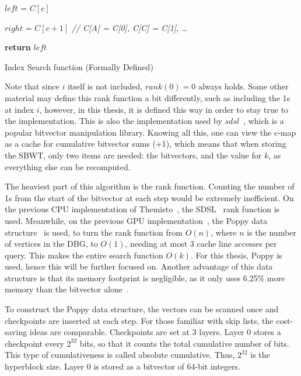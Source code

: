 \begin{algorithm}
  $\mathit{left}$ = $C[c]$

  $right$ = $C[c+1]$  \textit{// C[A] = C[0], C[C] = C[1], \ldots}

  \textbf{return} $\mathit{left}$
  \caption{Index Search function (Formally Defined)}\label{alg:IndexSearchFormalPseudoCode}
\end{algorithm}

Note that since $i$ itself is not included, $\mathit{rank}(0) = 0$ always holds.
Some other material may define this rank function a bit differently, such as including the 1s at index $i$, however, in this thesis, it is defined this way in order to stay true to the implementation.
This is also the implementation used by $sdsl$~\cite{SDSL}, which is a popular bitvector manipulation library.
Knowing all this, one can view the c-map as a cache for cumulative bitvector sums (+1), which means that when storing the SBWT, only two items are needed: the bitvectors, and the value for $k$, as everything else can be recomputed.

The heaviest part of this algorithm is the rank function.
Counting the number of 1s from the start of the bitvector at each step would be extremely inefficient.
On the previous CPU implementation of Themisto~\cite{Themisto}, the SDSL~\cite{SDSL} rank function is used.
Meanwhile, on the previous GPU implementation~\cite{Harri}, the Poppy data structure~\cite{Poppy} is used, to turn the rank function from $O(n)$, where $n$ is the number of vertices in the DBG, to $O(1)$, needing at most 3 cache line accesses per query.
This makes the entire search function $O(k)$.
For this thesis, Poppy is used, hence this will be further focused on.
Another advantage of this data structure is that its memory footprint is negligible, as it only uses 6.25\% more memory than the bitvector alone~\cite{Poppy}.

To construct the Poppy data structure, the vectors can be scanned once and checkpoints are inserted at each step.
For those familiar with skip lists, the cost-saving ideas are comparable.
Checkpoints are set at 3 layers.
Layer 0 stores a checkpoint every $2^{32}$ bits, so that it counts the total cumulative number of bits.
This type of cumulativeness is called absolute cumulative.
Thus, $2^{32}$ is the hyperblock size.
Layer 0 is stored as a bitvector of 64-bit integers.

